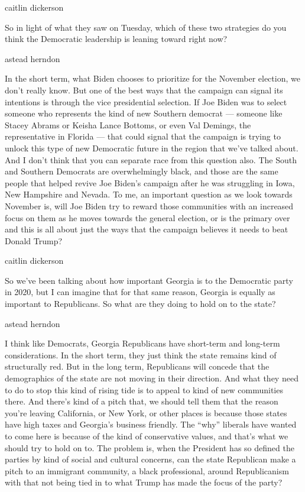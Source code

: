 caitlin dickerson

So in light of what they saw on Tuesday, which of these two strategies
do you think the Democratic leadership is leaning toward right now?

astead herndon

In the short term, what Biden chooses to prioritize for the November
election, we don't really know. But one of the best ways that the
campaign can signal its intentions is through the vice presidential
selection. If Joe Biden was to select someone who represents the kind of
new Southern democrat --- someone like Stacey Abrams or Keisha Lance
Bottoms, or even Val Demings, the representative in Florida --- that
could signal that the campaign is trying to unlock this type of new
Democratic future in the region that we've talked about. And I don't
think that you can separate race from this question also. The South and
Southern Democrats are overwhelmingly black, and those are the same
people that helped revive Joe Biden's campaign after he was struggling
in Iowa, New Hampshire and Nevada. To me, an important question as we
look towards November is, will Joe Biden try to reward those communities
with an increased focus on them as he moves towards the general
election, or is the primary over and this is all about just the ways
that the campaign believes it needs to beat Donald Trump?

caitlin dickerson

So we've been talking about how important Georgia is to the Democratic
party in 2020, but I can imagine that for that same reason, Georgia is
equally as important to Republicans. So what are they doing to hold on
to the state?

astead herndon

I think like Democrats, Georgia Republicans have short-term and
long-term considerations. In the short term, they just think the state
remains kind of structurally red. But in the long term, Republicans will
concede that the demographics of the state are not moving in their
direction. And what they need to do to stop this kind of rising tide is
to appeal to kind of new communities there. And there's kind of a pitch
that, we should tell them that the reason you're leaving California, or
New York, or other places is because those states have high taxes and
Georgia's business friendly. The ``why'' liberals have wanted to come
here is because of the kind of conservative values, and that's what we
should try to hold on to. The problem is, when the President has so
defined the parties by kind of social and cultural concerns, can the
state Republican make a pitch to an immigrant community, a black
professional, around Republicanism with that not being tied in to what
Trump has made the focus of the party?

